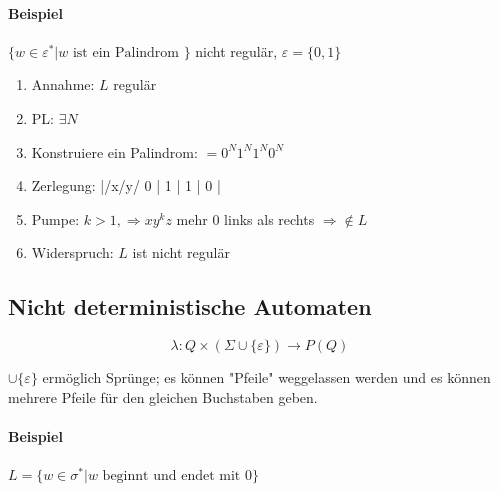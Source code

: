 \paragraph{Beispiel}
$\{w \in \varepsilon^\ast | w \text{ ist ein Palindrom }\}$ nicht regulär, $\varepsilon = \{0,1\}$

\begin{enumerate}
	\item	Annahme: $L$ regulär
	\item	PL: $\exists N$
	\item	Konstruiere ein Palindrom: $=0^N1^N1^N0^N$
	\item	Zerlegung: |/x/y/ 0 | 1  |  1 | 0 |
	\item	Pumpe: $k > 1, \Rightarrow xy^kz$ mehr $0$ links als rechts $\Rightarrow \not\in L$ \Lightning
	\item	Widerspruch: $L$ ist nicht regulär
\end{enumerate}

\subsection{Nicht deterministische Automaten}

\[
 \lambda : Q \times (\Sigma \cup \{\varepsilon\}) \rightarrow P(Q)
\]

$\cup \{\varepsilon\}$ ermöglich Sprünge; es können "Pfeile" weggelassen werden und es können mehrere Pfeile für den gleichen Buchstaben geben.

\paragraph{Beispiel} $L=\{ w \in \sigma^\ast | w \text{ beginnt und endet mit } 0\}$

%

